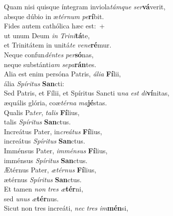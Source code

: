 \evenverse Quam nisi quisque íntegram inviola\textit{tám}\textit{que} \textit{ser}\textbf{vá}verit,~\*\\
\evenverse absque dúbio in æ\textit{tér}\textit{num} \textit{pe}\textbf{rí}bit.\\
\oddverse Fides autem cathólica hæc est:~+\\
\oddverse  ut unum Deum \textit{in} \textit{Tri}\textit{ni}\textbf{tá}te,~\*\\
\oddverse et Trinitátem in unitá\textit{te} \textit{ve}\textit{ne}\textbf{ré}mur.\\
\evenverse Neque confun\textit{dén}\textit{tes} \textit{per}\textbf{só}nas,~\*\\
\evenverse neque substánti\textit{am} \textit{se}\textit{pa}\textbf{rán}tes.\\
\oddverse Alia est enim persóna Patris, \textit{á}\textit{li}\textit{a} \textbf{Fí}lii,~\*\\
\oddverse ália \textit{Spí}\textit{ri}\textit{tus} \textbf{San}cti:\\
\evenverse Sed Patris, et Fílii, et Spíritus Sancti u\textit{na} \textit{est} \textit{di}\textbf{ví}nitas,~\*\\
\evenverse æquális glória, coæ\textit{tér}\textit{na} \textit{ma}\textbf{jé}stas.\\
\oddverse Qualis Pa\textit{ter}, \textit{ta}\textit{lis} \textbf{Fí}lius,~\*\\
\oddverse talis \textit{Spí}\textit{ri}\textit{tus} \textbf{San}ctus.\\
\evenverse Increátus Pater, in\textit{cre}\textit{á}\textit{tus} \textbf{Fí}lius,~\*\\
\evenverse increátus \textit{Spí}\textit{ri}\textit{tus} \textbf{San}ctus.\\
\oddverse Imménsus Pater, \textit{im}\textit{mén}\textit{sus} \textbf{Fí}lius,~\*\\
\oddverse imménsus \textit{Spí}\textit{ri}\textit{tus} \textbf{San}ctus.\\
\evenverse Ætérnus Pater, \textit{æ}\textit{tér}\textit{nus} \textbf{Fí}lius,~\*\\
\evenverse ætérnus \textit{Spí}\textit{ri}\textit{tus} \textbf{San}ctus.\\
\oddverse Et tamen \textit{non} \textit{tres} \textit{æ}\textbf{tér}ni,~\*\\
\oddverse sed \textit{u}\textit{nus} \textit{æ}\textbf{tér}nus.\\
\evenverse Sicut non tres increáti, \textit{nec} \textit{tres} \textit{im}\textbf{mén}si,~\*\\
